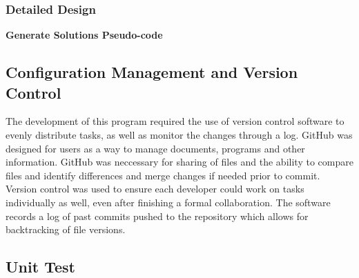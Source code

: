 \documentclass[12pt, a4]{report}
\begin{document}
		
	\subsubsection{Detailed Design}
	
	
	\textbf{Generate Solutions Pseudo-code}
	

	
	\pagebreak
	\subsection{Configuration Management and Version Control}
		\par 
		The development of this program required the use of version control software to evenly distribute tasks, as well as monitor the changes through a log. GitHub was designed for users as a way to manage documents, programs and other information. GitHub was neccessary for sharing of files and the ability to compare files and identify differences and merge changes if needed prior to commit. Version control was used to ensure each developer could work on tasks individually as well, even after finishing a formal collaboration. The software records a log of past commits pushed to the repository which allows for backtracking of file versions.
	
	\subsection{Unit Test}
\end{document}
